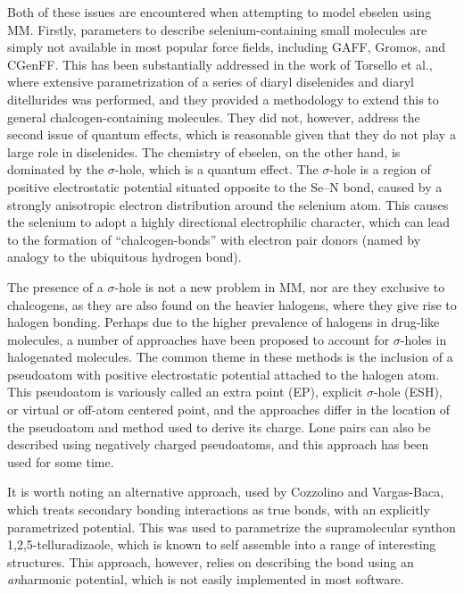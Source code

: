 \begin{refsection}
Both of these issues are encountered when attempting to model ebselen using MM.
Firstly, parameters to describe selenium-containing small molecules are simply not available in most popular force fields, including GAFF, Gromos, and CGenFF.
This has been substantially addressed in the work of Torsello et al., where extensive parametrization of a series of diaryl diselenides and diaryl ditellurides was performed, and they provided a methodology to extend this to general chalcogen-containing molecules.\autocite{Torsello2016}
They did not, however, address the second issue of quantum effects, which is reasonable given that they do not play a large role in diselenides.
The chemistry of ebselen, on the other hand, is dominated by the $\sigma$-hole, which is a quantum effect.\autocite{Thomas2015}
The $\sigma$-hole is a region of positive electrostatic potential situated opposite to the Se--N bond, caused by a strongly anisotropic electron distribution around the selenium atom.
This causes the selenium to adopt a highly directional electrophilic character, which can lead to the formation of ``chalcogen-bonds'' with electron pair donors (named by analogy to the ubiquitous hydrogen bond).\autocite{Murray2009}

The presence of a $\sigma$-hole is not a new problem in MM, nor are they exclusive to chalcogens, as they are also found on the heavier halogens, where they give rise to halogen bonding.\autocite{Clark2007}
Perhaps due to the higher prevalence of halogens in drug-like molecules, a number of approaches have been proposed to account for $\sigma$-holes in halogenated molecules.
The common theme in these methods is the inclusion of a pseudoatom with positive electrostatic potential attached to the halogen atom.
This pseudoatom is variously called an extra point (EP), explicit $\sigma$-hole (ESH), or virtual or off-atom centered point, and the approaches differ in the location of the pseudoatom and method used to derive its charge.\autocite{Renidine2011,Ibrahim2011,Hobza2012,Harder2016}
Lone pairs can also be described using negatively charged pseudoatoms, and this approach has been used for some time.\autocite{Dixon1997,Cieplak2001,Harder2016}

It is worth noting an alternative approach, used by Cozzolino and Vargas-Baca, which treats secondary bonding interactions as true bonds, with an explicitly parametrized potential.\autocite{Cozzolino2011}
This was used to parametrize the supramolecular synthon 1,2,5-tellura\-dizaole, which is known to self assemble into a range of interesting structures.
This approach, however, relies on describing the bond using an \emph{an}harmonic potential, which is not easily implemented in most software.


\end{refsection}
